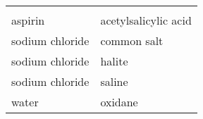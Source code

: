 
%
%
{ %


\newcommand{\tableheader}{\rowcolor{myblue}\multicolumn{2}{l}{\colhead{aliases}} \\}
\newcommand{\columnheaders}{\rowcolor{myblue}\colhead{\pk{alias}} & \colhead{\fk{aliased}} \\}

\begin{tabular} {|l|l|}
\hline
\tableheader
\hline
\columnheaders
\hline 
aspirin	& acetylsalicylic acid \\
\hline
sodium chloride & common salt \\
\hline
sodium chloride & halite \\
\hline
sodium chloride & saline \\	
\hline
water &	oxidane \\
\hline
\end{tabular}
}
		 
	